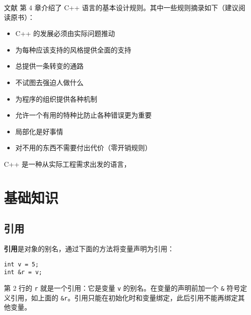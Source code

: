 \documentclass[hyperref,UTF8]{article}
\begin{document}
文献 \cite{BjarneStroustrup2002C} 第 4 章介绍了 C++ 语言的基本设计规则。其中一些规则摘录如下（建议阅读原书）：

\begin{itemize}
  \item C++ 的发展必须由实际问题推动
  \item 为每种应该支持的风格提供全面的支持
  \item 总提供一条转变的通路
  \item 不试图去强迫人做什么
  \item 为程序的组织提供各种机制
  \item 允许一个有用的特种比防止各种错误更为重要
  \item 局部化是好事情
  \item 对不用的东西不需要付出代价（零开销规则）
\end{itemize}

C++ 是一种从实际工程需求出发的语言，

\section{基础知识}

\subsection{引用}

\textbf{引用}是对象的别名，通过下面的方法将变量声明为引用：
\begin{lstlisting}
int v = 5;
int &r = v;
\end{lstlisting}
第 2 行的 \texttt{r} 就是一个引用：它是变量 \texttt{v} 的别名。在变量的声明前加一个 \texttt{\&} 符号定义引用，如上面的 \texttt{\&r}。引用只能在初始化时和变量绑定，此后引用不能再绑定其他变量。
\end{document}
